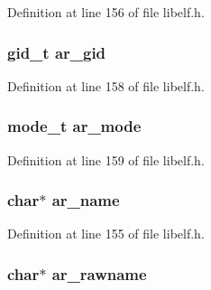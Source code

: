 \-Definition at line 156 of file libelf.\-h.

\hypertarget{struct_elf___arhdr_a33bea9112c0482b24dc067b370ba2d51}{
\subsubsection[{ar\-\_\-gid}]{\setlength{\rightskip}{0pt plus 5cm}gid\-\_\-t {\bf ar\-\_\-gid}}}\label{struct_elf___arhdr_a33bea9112c0482b24dc067b370ba2d51}


\-Definition at line 158 of file libelf.\-h.

\hypertarget{struct_elf___arhdr_ab1fb4a3f6d72dc9966ec7045ecefaa9c}{
\subsubsection[{ar\-\_\-mode}]{\setlength{\rightskip}{0pt plus 5cm}mode\-\_\-t {\bf ar\-\_\-mode}}}\label{struct_elf___arhdr_ab1fb4a3f6d72dc9966ec7045ecefaa9c}


\-Definition at line 159 of file libelf.\-h.

\hypertarget{struct_elf___arhdr_a6f32a7e7c8bd64df5c2b1fd10f758ccb}{
\subsubsection[{ar\-\_\-name}]{\setlength{\rightskip}{0pt plus 5cm}char$\ast$ {\bf ar\-\_\-name}}}\label{struct_elf___arhdr_a6f32a7e7c8bd64df5c2b1fd10f758ccb}


\-Definition at line 155 of file libelf.\-h.

\hypertarget{struct_elf___arhdr_ac6c218297c1c96f8efcf1809635bc1c6}{
\subsubsection[{ar\-\_\-rawname}]{\setlength{\rightskip}{0pt plus 5cm}char$\ast$ {\bf ar\-\_\-rawname}}}\label{struct_elf___arhdr_ac6c218297c1c96f8efcf1809635bc1c6}


